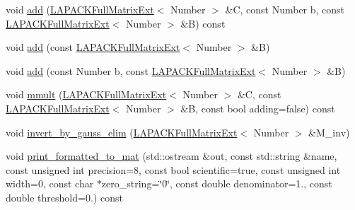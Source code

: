 \begin{DoxyCompactItemize}
\item 
void \hyperlink{classLAPACKFullMatrixExt_a793c6b5e30522c2ae653df0e80ed6ab3}{add} (\hyperlink{classLAPACKFullMatrixExt}{L\+A\+P\+A\+C\+K\+Full\+Matrix\+Ext}$<$ Number $>$ \&C, const Number b, const \hyperlink{classLAPACKFullMatrixExt}{L\+A\+P\+A\+C\+K\+Full\+Matrix\+Ext}$<$ Number $>$ \&B) const
\item 
void \hyperlink{classLAPACKFullMatrixExt_ae199890a11b5034d8ec2342c7de6c439}{add} (const \hyperlink{classLAPACKFullMatrixExt}{L\+A\+P\+A\+C\+K\+Full\+Matrix\+Ext}$<$ Number $>$ \&B)
\item 
void \hyperlink{classLAPACKFullMatrixExt_a7c46d0cb2e278577196b3d923e389efd}{add} (const Number b, const \hyperlink{classLAPACKFullMatrixExt}{L\+A\+P\+A\+C\+K\+Full\+Matrix\+Ext}$<$ Number $>$ \&B)
\item 
void \hyperlink{classLAPACKFullMatrixExt_a176ae32c5467facafd5dcc3252c07c20}{mmult} (\hyperlink{classLAPACKFullMatrixExt}{L\+A\+P\+A\+C\+K\+Full\+Matrix\+Ext}$<$ Number $>$ \&C, const \hyperlink{classLAPACKFullMatrixExt}{L\+A\+P\+A\+C\+K\+Full\+Matrix\+Ext}$<$ Number $>$ \&B, const bool adding=false) const
\item 
void \hyperlink{classLAPACKFullMatrixExt_a13bbc430a0f60d4158d1693a2d7a0235}{invert\+\_\+by\+\_\+gauss\+\_\+elim} (\hyperlink{classLAPACKFullMatrixExt}{L\+A\+P\+A\+C\+K\+Full\+Matrix\+Ext}$<$ Number $>$ \&M\+\_\+inv)
\item 
void \hyperlink{classLAPACKFullMatrixExt_aae17980cb1bd3802fdc4a629040b6ed7}{print\+\_\+formatted\+\_\+to\+\_\+mat} (std\+::ostream \&out, const std\+::string \&name, const unsigned int precision=8, const bool scientific=true, const unsigned int width=0, const char $\ast$zero\+\_\+string=\char`\"{}0\char`\"{}, const double denominator=1., const double threshold=0.) const
\end{DoxyCompactItemize}
